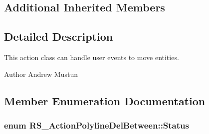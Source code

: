 \subsection*{Additional Inherited Members}


\subsection{Detailed Description}
This action class can handle user events to move entities.

\begin{DoxyAuthor}{Author}
Andrew Mustun 
\end{DoxyAuthor}


\subsection{Member Enumeration Documentation}
\hypertarget{classRS__ActionPolylineDelBetween_ae1df6326a0a5a6c392e1918b769817ab}{
\subsubsection[{Status}]{\setlength{\rightskip}{0pt plus 5cm}enum {\bf R\-S\-\_\-\-Action\-Polyline\-Del\-Between\-::\-Status}}}\label{classRS__ActionPolylineDelBetween_ae1df6326a0a5a6c392e1918b769817ab}
